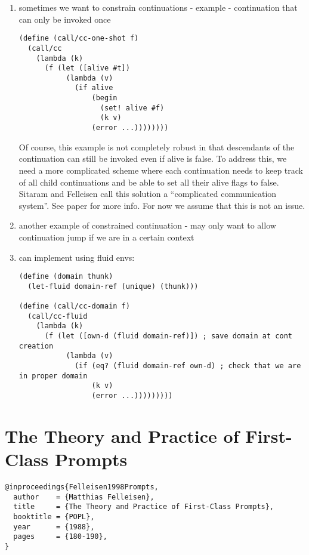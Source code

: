 \documentclass[letterpaper]{llncs}
\begin{document}
\begin{enumerate}
	\item sometimes we want to constrain continuations - example - continuation that can only be invoked once
\begin{verbatim}
(define (call/cc-one-shot f)
  (call/cc
    (lambda (k)
      (f (let ([alive #t])
           (lambda (v)
             (if alive
                 (begin
                   (set! alive #f)
                   (k v)
                 (error ...))))))))
\end{verbatim}
Of course, this example is not completely robust in that descendants of the continuation can still be invoked even if alive is false. To address this, we need a more complicated scheme where each continuation needs to keep track of all child continuations and be able to set all their alive flags to false. Sitaram and Felleisen call this solution a ``complicated communication system''. See paper for more info. For now we assume that this is not an issue.
	\item another example of constrained continuation - may only want to allow continuation jump if we are in a certain context
	\item can implement using fluid envs:
\begin{verbatim}
(define (domain thunk)
  (let-fluid domain-ref (unique) (thunk)))
  
(define (call/cc-domain f)
  (call/cc-fluid
    (lambda (k)
      (f (let ([own-d (fluid domain-ref)]) ; save domain at cont creation
           (lambda (v)
             (if (eq? (fluid domain-ref own-d) ; check that we are in proper domain
                 (k v)
                 (error ...)))))))))
\end{verbatim}
\end{enumerate}


\section*{The Theory and Practice of First-Class Prompts}%

\begin{verbatim}
@inproceedings{Felleisen1998Prompts,
  author    = {Matthias Felleisen},
  title     = {The Theory and Practice of First-Class Prompts},
  booktitle = {POPL},
  year      = {1988},
  pages     = {180-190},
}
\end{verbatim}
\end{document}
